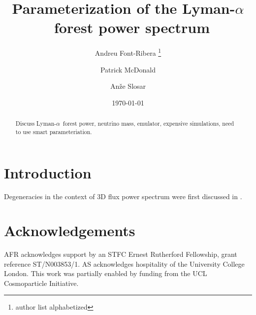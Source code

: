 \documentclass[preprintnumbers,prd,superscriptaddress,notitlepage,nofootinbib] {revtex4-1}
\newcommand{\lya}{Lyman-$\alpha$}
\begin{document}
\title{Parameterization of the \lya\ forest power spectrum}

\author{Andreu Font-Ribera \footnote{author list alphabetized}}
\author{Patrick McDonald}
\author{An\v{z}e Slosar}

\date{\today}

\begin{abstract}
Discuss \lya\ forest power, neutrino mass, emulator, expensive
simulations, need to use smart parameteriation.
\end{abstract}

\maketitle

\section{Introduction}

Degeneracies in the context of 3D flux power spectrum were first discussed 
in \cite{McDonald2003}.

\section*{Acknowledgements}
AFR acknowledges support by an STFC Ernest Rutherford Fellowship, grant reference ST/N003853/1.
AS acknowledges hospitality of the University College London.
This work was partially enabled by funding from the UCL Cosmoparticle
Initiative.




\end{document}

